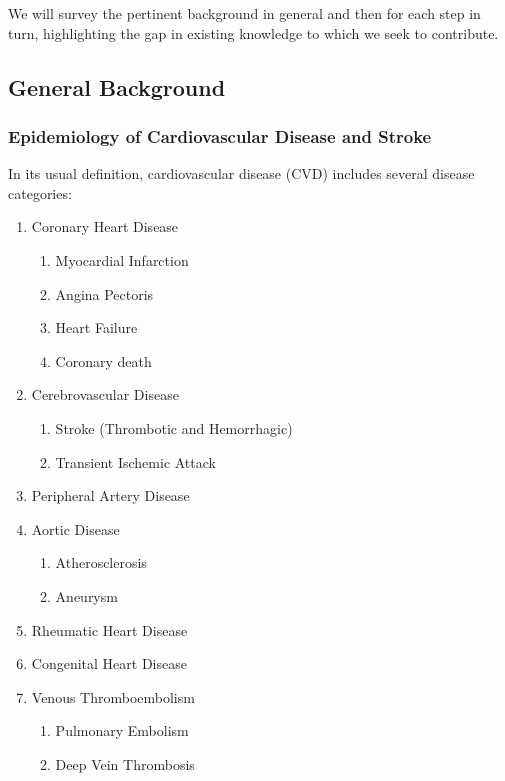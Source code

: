 \documentclass[a4paper,12pt]{article}
\begin{document}
		We will survey the pertinent background in general and then for each step in turn, highlighting the gap in existing knowledge to which we seek to contribute.

		\subsection{General Background}
		
			\subsubsection{Epidemiology of Cardiovascular Disease and Stroke}
			
			In its usual definition, cardiovascular disease (CVD) includes several disease categories\cite{WHO2017}:
			\begin{enumerate}
				\item Coronary Heart Disease
				\begin{enumerate}
					\item Myocardial Infarction
					\item Angina Pectoris
					\item Heart Failure
					\item Coronary death
				\end{enumerate}
				\item Cerebrovascular Disease
				\begin{enumerate}
					\item Stroke (Thrombotic and Hemorrhagic)
					\item Transient Ischemic Attack
				\end{enumerate}
				\item Peripheral Artery Disease
				\item Aortic Disease
				\begin{enumerate}
					\item Atherosclerosis
					\item Aneurysm
				\end{enumerate}
				\item Rheumatic Heart Disease
				\item Congenital Heart Disease
				\item Venous Thromboembolism
				\begin{enumerate}
					\item Pulmonary Embolism
					\item Deep Vein Thrombosis
				\end{enumerate}
			\end{enumerate}
			
\end{document}
